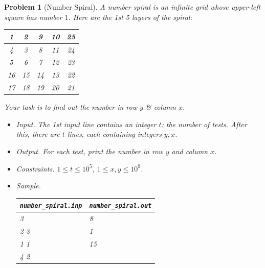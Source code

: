 \documentclass{article}
\newtheorem{problem}{Problem}
\begin{document}
\begin{problem}[Number Spiral]
	A \emph{number spiral} is an infinite grid whose upper-left square has number $1$. Here are the 1st 5 layers of the spiral:
	\begin{table}[H]
		\centering
		\begin{tabular}{|c|c|c|c|c|}
			\hline
			1 & 2 & 9 & 10 & 25 \\
			\hline
			4 & 3 & 8 & 11 & 24 \\
			\hline
			5 & 6 & 7 & 12 & 23 \\
			\hline
			16 & 15 & 14 & 13 & 22 \\
			\hline
			17 & 18 & 19 & 20 & 21 \\
			\hline
		\end{tabular}
	\end{table}
	Your task is to find out the number in row $y$ \& column $x$.
	\begin{itemize}
		\item {\sf Input.} The 1st input line contains an integer $t$: the number of tests. After this, there are $t$ lines, each containing integers $y,x$.
		\item {\sf Output.} For each test, print the number in row $y$ and column $x$.
		\item {\sf Constraints.} $1\le t\le10^5$, $1\le x,y\le10^9$.
		\item {\sf Sample.}
		\begin{table}[H]
			\centering
			\begin{tabular}{|l|l|}
				\hline
				\verb|number_spiral.inp| & \verb|number_spiral.out| \\
				\hline
				3 & 8 \\
				2 3 & 1 \\
				1 1 & 15 \\
				4 2 & \\
				\hline				
			\end{tabular}
		\end{table}
	\end{itemize}
\end{problem}


\printbibliography[heading=bibintoc]
\end{document}
